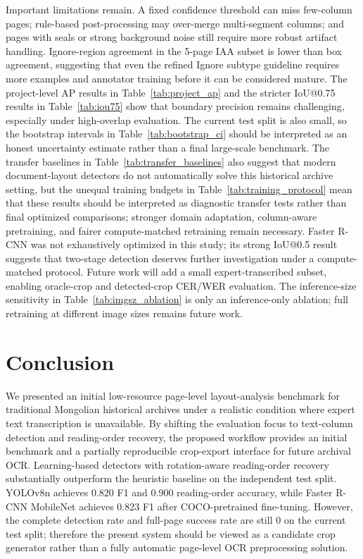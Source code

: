 \documentclass[pdflatex,sn-mathphys-num]{sn-jnl}
\begin{document}
Important limitations remain. A fixed confidence threshold can miss few-column pages; rule-based post-processing may over-merge multi-segment columns; and pages with seals or strong background noise still require more robust artifact handling. Ignore-region agreement in the 5-page IAA subset is lower than box agreement, suggesting that even the refined Ignore subtype guideline requires more examples and annotator training before it can be considered mature. The project-level AP results in Table~\ref{tab:project_ap} and the stricter IoU@0.75 results in Table~\ref{tab:iou75} show that boundary precision remains challenging, especially under high-overlap evaluation. The current test split is also small, so the bootstrap intervals in Table~\ref{tab:bootstrap_ci} should be interpreted as an honest uncertainty estimate rather than a final large-scale benchmark. The transfer baselines in Table~\ref{tab:transfer_baselines} also suggest that modern document-layout detectors do not automatically solve this historical archive setting, but the unequal training budgets in Table~\ref{tab:training_protocol} mean that these results should be interpreted as diagnostic transfer tests rather than final optimized comparisons; stronger domain adaptation, column-aware pretraining, and fairer compute-matched retraining remain necessary. Faster R-CNN was not exhaustively optimized in this study; its strong IoU@0.5 result suggests that two-stage detection deserves further investigation under a compute-matched protocol. Future work will add a small expert-transcribed subset, enabling oracle-crop and detected-crop CER/WER evaluation. The inference-size sensitivity in Table~\ref{tab:imgsz_ablation} is only an inference-only ablation; full retraining at different image sizes remains future work.

\section{Conclusion}
We presented an initial low-resource page-level layout-analysis benchmark for traditional Mongolian historical archives under a realistic condition where expert text transcription is unavailable. By shifting the evaluation focus to text-column detection and reading-order recovery, the proposed workflow provides an initial benchmark and a partially reproducible crop-export interface for future archival OCR. Learning-based detectors with rotation-aware reading-order recovery substantially outperform the heuristic baseline on the independent test split. YOLOv8n achieves 0.820 F1 and 0.900 reading-order accuracy, while Faster R-CNN MobileNet achieves 0.823 F1 after COCO-pretrained fine-tuning. However, the complete detection rate and full-page success rate are still 0 on the current test split; therefore the present system should be viewed as a candidate crop generator rather than a fully automatic page-level OCR preprocessing solution.
\end{document}
